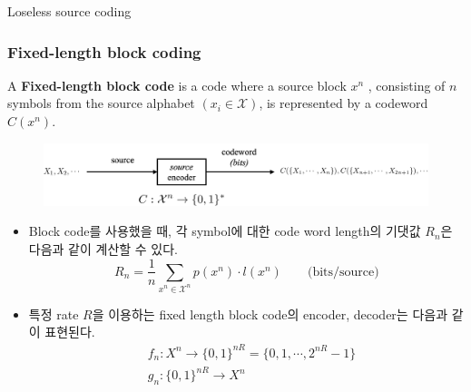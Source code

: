 \documentclass[9pt]{beamer}
\begin{document}
    \begin{section}{Loseless source coding}
        \begin{frame}
            \frametitle{Fixed-length block coding}
            \begin{definition}
                A \textbf{Fixed-length block code }is a code where a source block  $x^n$ , consisting of  $n$ symbols from the source alphabet $(x_i \in \mathcal X)$, is represented by a codeword $C(x^n)$.
            \end{definition}
            \begin{figure}
                \includegraphics[width=0.9\columnwidth]{image/L3_block.png}
            \end{figure}
            \begin{itemize}
                \item Block code를 사용했을 때, 각 symbol에 대한 code word length의 기댓값 $R_n$은 다음과 같이 계산할 수 있다.
                $$R_n = \frac{1}{n} \sum_{x^n \in \mathcal X^n} p(x^n) \cdot l(x^n)\qquad \text{(bits/source)}$$
                \item 특정 rate $R$을 이용하는 fixed length block code의 encoder, decoder는 다음과 같이 표현된다.
                $$ \begin{aligned} & f_n: X^n \rightarrow\{0,1\}^{n R}=\big\{0,1, \cdots, 2^{nR}-1 \big\} 
                    \\ & g_n:\{0,1\}^{n R} \rightarrow X^n \end{aligned} $$
            \end{itemize}
        \end{frame}
        

\end{section}
\end{document}
